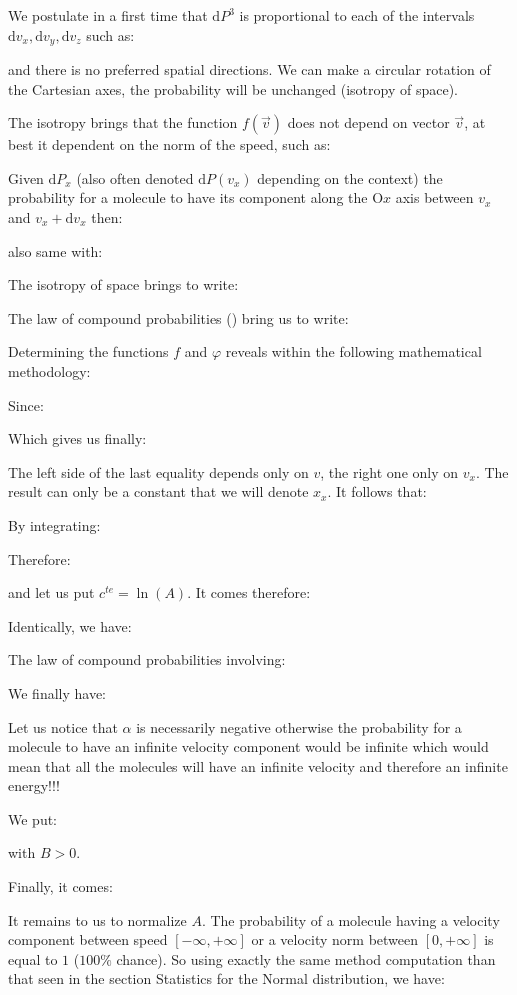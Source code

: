 	We postulate in a first time that $\mathrm{d}P^3$ is proportional to each of the intervals $\mathrm{d}v_x,\mathrm{d}v_y,\mathrm{d}v_z$ such as:
	
	and there is no preferred spatial directions. We can make a circular rotation of the Cartesian axes, the probability will be unchanged (isotropy of space).
	
	The isotropy brings that the function $f(\vec{v})$ does not depend on vector $\vec{v}$, at best it dependent on the norm of the speed, such as:
	
	Given $\mathrm{d}P_x$ (also often denoted $\mathrm{d}P(v_x)$ depending on the context) the probability for a molecule to have its component along the O$x$ axis between $v_x$ and $v_x+\mathrm{d}v_x$ then:
	
	also same with:
	
	The isotropy of space brings to write:
	
	The law of compound probabilities () bring us to write:
	
	
	Determining the functions $f$ and $\varphi$ reveals within the following mathematical methodology:
	
	Since:
	
	Which gives us finally:
	
	The left side of the last equality depends only on $v$, the right one only on $v_x$. The result can only be a constant that we will denote $x_x$. It follows that:
	
	By integrating:
	
	Therefore:
	
	and let us put $c^{te}=\ln(A)$. It comes therefore:
	
	Identically, we have:
	
	The law of compound probabilities involving:
	
	We finally have:
	
	Let us notice that $\alpha$ is necessarily negative otherwise the probability for a molecule to have an infinite velocity component would be infinite which would mean that all the molecules will have an infinite velocity and therefore an infinite energy!!!

	We put:
	
	with $B>0$. 

	Finally, it comes:
	
	It remains to us to normalize $A$. The probability of a molecule having a velocity component between speed $[-\infty,+\infty]$ or a velocity norm between $[0,+\infty]$ is equal to $1$ ($100\%$ chance). So using exactly the same method computation than that seen in the section Statistics for the Normal distribution, we have:
	
